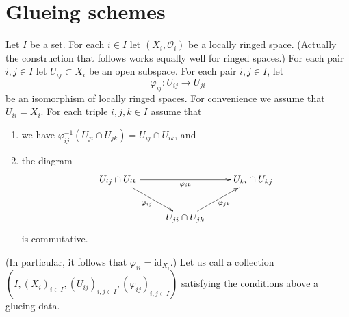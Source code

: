 \section{Glueing schemes}
\label{section-glueing-schemes}

\noindent
Let $I$ be a set.
For each $i \in I$ let $(X_i, \mathcal{O}_i)$ be
a locally ringed space. (Actually the construction that
follows works equally well for ringed spaces.)
For each pair $i, j \in I$ let $U_{ij} \subset X_i$
be an open subspace.
For each pair $i, j \in I$, let
$$
\varphi_{ij} : U_{ij} \to U_{ji}
$$
be an isomorphism of locally ringed spaces.
For convenience we assume that $U_{ii} = X_i$.
For each triple $i, j, k \in I$ assume that
\begin{enumerate}
\item we have
$\varphi_{ij}^{-1}(U_{ji} \cap U_{jk}) =  U_{ij} \cap U_{ik}$, and
\item the diagram
$$
\xymatrix{
U_{ij} \cap U_{ik} \ar[rr]_{\varphi_{ik}} \ar[rd]_{\varphi_{ij}} & &
U_{ki} \cap U_{kj} \\
& U_{ji} \cap U_{jk} \ar[ru]_{\varphi_{jk}}
}
$$
is commutative.
\end{enumerate}
(In particular, it follows that $\varphi_{ii} = \text{id}_{X_i}$.)
Let us call a collection
$(I, (X_i)_{i\in I}, (U_{ij})_{i, j\in I}, (\varphi_{ij})_{i, j\in I})$
satisfying the conditions above a glueing data.

